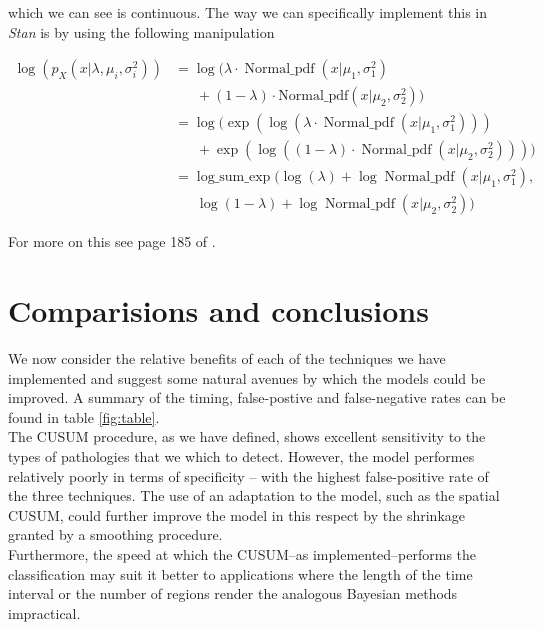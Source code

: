 \documentclass[11pt]{report}
\begin{document}
which we can see is continuous. The way we can specifically implement this in \emph{Stan} is by using the following manipulation

\begin{align}
\log(p_X(x | \lambda, \mu_i, \sigma^2_i)) &= \log(\lambda \cdot \operatorname{Normal\_pdf}(x | \mu_1, \sigma_1^2)  \nonumber \\
& \ \ \ \ \ \ \ + (1 - \lambda) \cdot \text{Normal\_pdf}(x | \mu_2, \sigma_2^2)) \\
&= \log(\exp(\log(\lambda \cdot \operatorname{Normal\_pdf}(x | \mu_1, \sigma_1^2)))  \nonumber \\
& \ \ \ \ \ \ \ + \exp(\log((1 - \lambda) \cdot \operatorname{Normal\_pdf}(x | \mu_2, \sigma_2^2)))) \\
&= \operatorname{log\_sum\_exp}(\log(\lambda) + \log\operatorname{Normal\_pdf}(x | \mu_1, \sigma_1^2),  \nonumber \\
& \ \ \ \ \ \ \ \log(1 - \lambda) + \log\operatorname{Normal\_pdf}(x | \mu_2, \sigma_2^2))
\end{align} 

For more on this see page 185 of \cite{stan}.

\chapter{Comparisions and conclusions}

We now consider the relative benefits of each of the techniques we have implemented and suggest some natural avenues by which the models could be improved. A summary of the timing, false-postive and false-negative rates can be found in table \ref{fig:table}. \\

The CUSUM procedure, as we have defined, shows excellent sensitivity to the types of pathologies that we which to detect. However, the model performes relatively poorly in terms of specificity -- with the highest false-positive rate of the three techniques. The use of an adaptation to the model, such as the spatial CUSUM, could further improve the model in this respect by the shrinkage granted by a smoothing procedure. \\

Furthermore, the speed at which the CUSUM--as implemented--performs the classification may suit it better to applications where the length of the time interval or the number of regions render the analogous Bayesian methods impractical. \\
\end{document}
